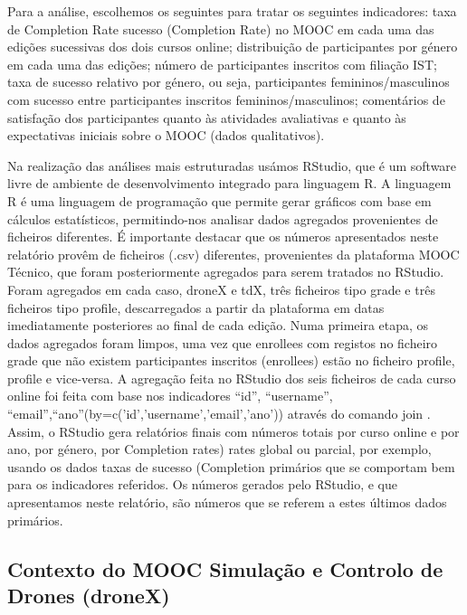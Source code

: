 Para a análise,
escolhemos os seguintes para tratar os seguintes indicadores: taxa de Completion Rate
sucesso (Completion Rate) no MOOC em cada uma das edições sucessivas dos dois cursos online; distribuição de participantes por género em cada uma das edições; número de participantes inscritos com filiação IST; taxa de sucesso relativo por género, ou seja, participantes femininos/masculinos com sucesso entre participantes inscritos femininos/masculinos; comentários de satisfação dos participantes quanto às atividades avaliativas e quanto às expectativas iniciais sobre o MOOC (dados
qualitativos).

Na realização das análises mais estruturadas usámos RStudio, que é um software
livre de ambiente de desenvolvimento integrado para linguagem R. A linguagem R é uma linguagem de programação que permite gerar gráficos com base em cálculos estatísticos, permitindo-nos analisar dados agregados provenientes de ficheiros diferentes. É importante destacar que os números apresentados neste relatório provêm de ficheiros (.csv) diferentes, provenientes da plataforma MOOC Técnico, que foram posteriormente agregados para serem tratados no RStudio. Foram agregados em cada caso, droneX e tdX, três ficheiros tipo grade e três ficheiros tipo profile, descarregados a partir da plataforma em datas imediatamente posteriores ao final de cada edição. Numa primeira etapa, os dados agregados foram limpos, uma vez que
enrollees com registos no ficheiro grade que não existem participantes inscritos (enrollees)
estão no ficheiro profile, profile e vice-versa. A agregação feita no RStudio dos seis ficheiros de cada curso online foi feita com base nos indicadores “id”, “username”,
“email”,“ano”(by=c('id','username','email','ano')) através do comando join . Assim, o RStudio
gera relatórios finais com números totais por curso online e por ano, por género, por
Completion rates) rates global ou parcial, por exemplo, usando os dados taxas de sucesso (Completion primários que se comportam bem para os indicadores referidos. Os números gerados
pelo RStudio, e que apresentamos neste relatório, são números que se referem a
estes últimos dados primários.

\subsection{Contexto do MOOC Simulação e Controlo de Drones (droneX)}

